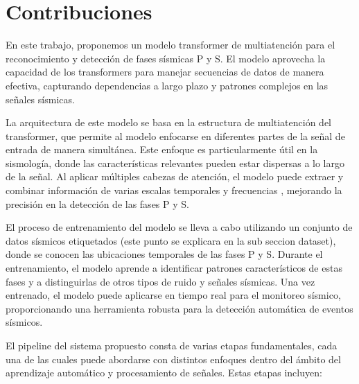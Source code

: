 \section{Contribuciones}

En este trabajo, proponemos un modelo transformer de multiatención para el reconocimiento y detección de fases sísmicas P y S. El modelo aprovecha la capacidad de los transformers para manejar secuencias de datos de manera efectiva, capturando dependencias a largo plazo y patrones complejos en las señales sísmicas.

La arquitectura de este modelo se basa en la estructura de multiatención del transformer, que permite al modelo enfocarse en diferentes partes de la señal de entrada de manera simultánea. Este enfoque es particularmente útil en la sismología, donde las características relevantes pueden estar dispersas a lo largo de la señal. Al aplicar múltiples cabezas de atención, el modelo puede extraer y combinar información de varias escalas temporales y frecuencias \cite{46201}, mejorando la precisión en la detección de las fases P y S.

El proceso de entrenamiento del modelo se lleva a cabo utilizando un conjunto de datos sísmicos etiquetados (este punto se explicara en la sub seccion dataset), donde se conocen las ubicaciones temporales de las fases P y S. Durante el entrenamiento, el modelo aprende a identificar patrones característicos de estas fases y a distinguirlas de otros tipos de ruido y señales sísmicas. Una vez entrenado, el modelo puede aplicarse en tiempo real para el monitoreo sísmico, proporcionando una herramienta robusta para la detección automática de eventos sísmicos.

El pipeline del sistema propuesto consta de varias etapas fundamentales, cada una de las cuales puede abordarse con distintos enfoques dentro del ámbito del aprendizaje automático y procesamiento de señales. Estas etapas incluyen:

